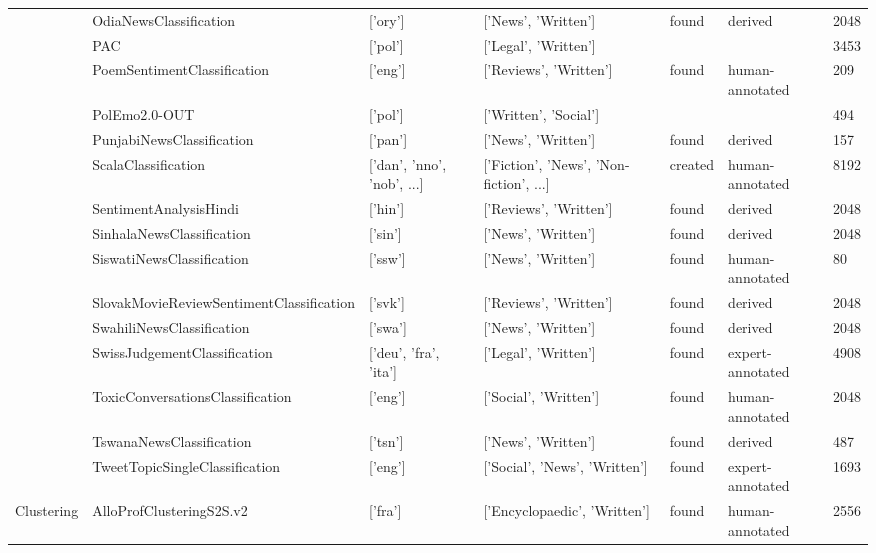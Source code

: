 \begin{table*}[!htb]
{\begin{tabular}{lllllll}
     & OdiaNewsClassification \cite{kunchukuttan2020indicnlpcorpus} & ['ory'] & ['News', 'Written'] & found & derived & 2048 \\
     & PAC \cite{augustyniak2022waydesigningcompilinglepiszcze} & ['pol'] & ['Legal', 'Written'] & & & 3453 \\
     & PoemSentimentClassification \cite{sheng2020investigating} & ['eng'] & ['Reviews', 'Written'] & found & human-annotated & 209 \\
     & PolEmo2.0-OUT  & ['pol'] & ['Written', 'Social'] & & & 494 \\
     & PunjabiNewsClassification \cite{kunchukuttan2020indicnlpcorpus} & ['pan'] & ['News', 'Written'] & found & derived & 157 \\
     & ScalaClassification \cite{nielsen-2023-scandeval} & ['dan', 'nno', 'nob', ...] & ['Fiction', 'News', 'Non-fiction', ...] & created & human-annotated & 8192 \\
     & SentimentAnalysisHindi \cite{OdiaGenAI} & ['hin'] & ['Reviews', 'Written'] & found & derived & 2048 \\
     & SinhalaNewsClassification \cite{deSilva2015} & ['sin'] & ['News', 'Written'] & found & derived & 2048 \\
     & SiswatiNewsClassification \cite{Madodonga_Marivate_Adendorff_2023} & ['ssw'] & ['News', 'Written'] & found & human-annotated & 80 \\
     & SlovakMovieReviewSentimentClassification \cite{vstefanik2023resources} & ['svk'] & ['Reviews', 'Written'] & found & derived & 2048 \\
     & SwahiliNewsClassification \cite{davis2020swahili} & ['swa'] & ['News', 'Written'] & found & derived & 2048 \\
     & SwissJudgementClassification \cite{niklaus2022empirical} & ['deu', 'fra', 'ita'] & ['Legal', 'Written'] & found & expert-annotated & 4908 \\
     & ToxicConversationsClassification \cite{jigsaw-unintended-bias-in-toxicity-classification} & ['eng'] & ['Social', 'Written'] & found & human-annotated & 2048 \\
     & TswanaNewsClassification \cite{marivate2023puoberta} & ['tsn'] & ['News', 'Written'] & found & derived & 487 \\
     & TweetTopicSingleClassification \cite{dimosthenis-etal-2022-twitter} & ['eng'] & ['Social', 'News', 'Written'] & found & expert-annotated & 1693 \\
    \cline{1-7}
    \multirow[t]{17}{*}{Clustering} & AlloProfClusteringS2S.v2 \cite{lef23} & ['fra'] & ['Encyclopaedic', 'Written'] & found & human-annotated & 2556 \\

\end{tabular}}
\end{table*}
